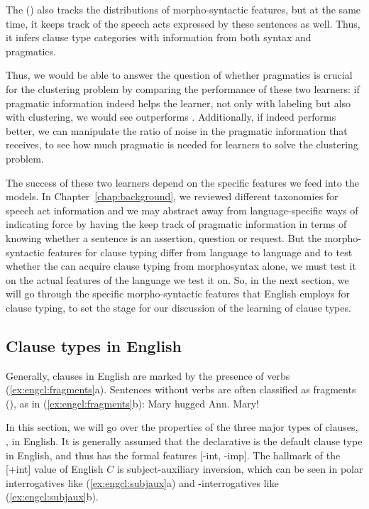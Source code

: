 The \tbf{\praglearner{}} (\plearnerabbr{}) also tracks the distributions of morpho-syntactic features, but at the same time, it keeps track of the speech acts expressed by these sentences as well. Thus, it infers clause type categories with information from both syntax and pragmatics. 

Thus, we would be able to answer the question of whether pragmatics is crucial for the clustering problem by comparing the performance of these two learners: if pragmatic information indeed helps the learner, not only with labeling but also with clustering, we would see \plearnerabbr{} outperforms \dlearnerabbr. Additionally, if \plearnerabbr{} indeed performs better, we can manipulate the ratio of noise in the pragmatic information that \plearnerabbr{} receives, to see how much pragmatic is needed for learners to solve the clustering problem. 


The success of these two learners depend on the specific features we feed into the models. In Chapter~\ref{chap:background}, we reviewed different taxonomies for speech act information and we may abstract away from language-specific ways of indicating force by having the \plearnerabbr{} keep track of pragmatic information in terms of knowing whether a sentence is an assertion, question or request. But the morpho-syntactic features for clause typing differ from language to language and to test whether the \dlearnerabbr{} can acquire clause typing from morphosyntax alone, we must test it on the actual features of the language we test it on. So, in the next section, we will go through the specific morpho-syntactic features that English employs for clause typing, to set the stage for our discussion of the learning of clause types. 


\subsection{Clause types in English} \label{sec:engcl:bg:grammar}

Generally, clauses in English are marked by the presence of verbs (\ref{ex:engcl:fragments}a). Sentences without verbs are often classified as fragments (\cite{sz1985speechact}), as in (\ref{ex:engcl:fragments}b):
\bxl{}
Mary hugged Ann.
\ex
Mary!
\exl
\eex

In this section, we will go over the properties of the three major types of clauses, \diis{}, in English. 
It is generally assumed that the declarative is the default clause type in English, and thus has the formal features [-int, -imp]. The hallmark of the [+int] value of English $C$ is subject-auxiliary inversion, which can be seen in polar interrogatives like  (\ref{ex:engcl:subjaux}a) and \twh-interrogatives like (\ref{ex:engcl:subjaux}b). 

